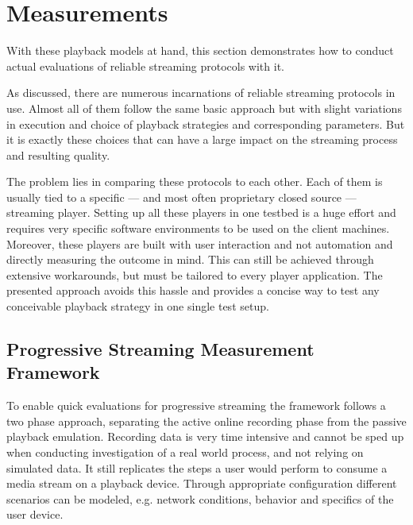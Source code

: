 \section{Measurements}
\label{c3:measurements}

With these playback models at hand, this section demonstrates how to conduct actual evaluations of reliable streaming protocols with it.

As discussed, there are numerous incarnations of reliable streaming protocols in use. Almost all of them follow the same basic approach but with slight variations in execution and choice of playback strategies and corresponding parameters. But it is exactly these choices that can have a large impact on the streaming process and resulting quality. 

The problem lies in comparing these protocols to each other. Each of them is usually tied to a specific --- and most often proprietary closed source --- streaming player. Setting up all these players in one testbed is a huge effort and requires very specific software environments to be used on the client machines. Moreover, these players are built with user interaction and not automation and directly measuring the outcome in mind. This can still be achieved through extensive workarounds, but must be tailored to every player application. The presented approach avoids this hassle and provides a concise way to test any conceivable playback strategy in one single test setup.


\subsection{Progressive Streaming Measurement Framework}

To enable quick evaluations for progressive streaming the framework follows a two phase approach, separating the active online recording phase from the passive playback emulation. Recording data is very time intensive and cannot be sped up when conducting investigation of a real world process, and not relying on simulated data. It still replicates the steps a user would perform to consume a media stream on a playback device. Through appropriate configuration different scenarios can be modeled, e.g. network conditions, behavior and specifics of the user device.
 
